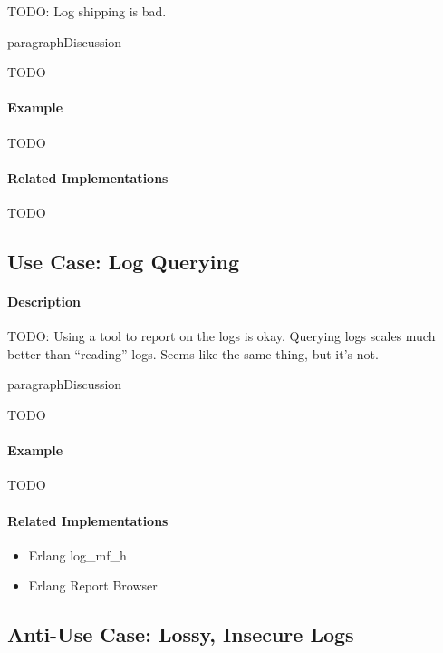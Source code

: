 {\Large TODO:} Log shipping is bad.

paragraph{Discussion}

{\Large TODO}

\paragraph{Example}

{\Large TODO}

\paragraph{Related Implementations}

{\Large TODO}

\subsection{Use Case: Log Querying}

\paragraph{Description}

{\Large TODO:} Using a tool to report on the logs is okay.  Querying logs scales much better than ``reading'' logs.  Seems like the same thing, but it's not.

paragraph{Discussion}

{\Large TODO}

\paragraph{Example}

{\Large TODO}

\paragraph{Related Implementations}

\begin{itemize}
	\item Erlang \textsf{log\_mf\_h}
	\item Erlang Report Browser
\end{itemize}

\subsection{Anti-Use Case: Lossy, Insecure Logs}

